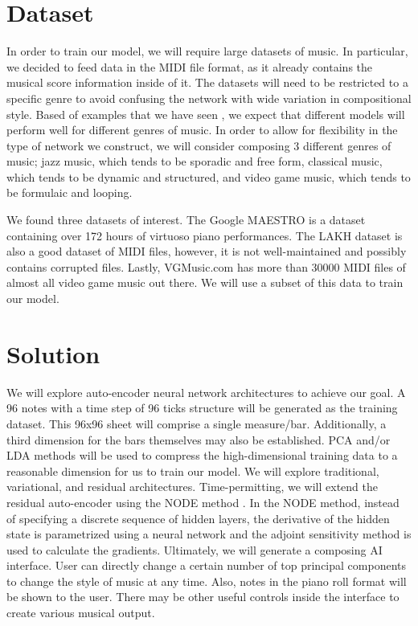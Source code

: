 \documentclass[conference]{IEEEtran}
\begin{document}
\section{Dataset}
In order to train our model, we will require large datasets of music. In particular, we decided to feed data in the MIDI file format, as it already contains the musical score information inside of it. The datasets will need to be restricted to a specific genre to avoid confusing the network with wide variation in compositional style. Based of examples that we have seen \cite{ComposerVideo}\cite{JazzVideo}\cite{BaroqueVideo}, we expect that different models will perform well for different genres of music. In order to allow for flexibility in the type of network we construct, we will consider composing 3 different genres of music; jazz music, which tends to be sporadic and free form, classical music, which tends to be dynamic and structured, and video game music, which tends to be formulaic and looping.\par 
We found three datasets of interest. The Google MAESTRO \cite{maestro2018} is a dataset containing over 172 hours of virtuoso piano performances. The LAKH dataset \cite{lakh2011} is also a good dataset of MIDI files, however, it is not well-maintained and possibly contains corrupted files. Lastly, VGMusic.com \cite{vgmusic} has more than 30000 MIDI files of almost all video game music out there. We will use a subset of this data to train our model.


\section{Solution}
We will explore auto-encoder neural network architectures to achieve our goal.
A 96 notes with a time step of 96 ticks structure will be generated as the training dataset. This 96x96 sheet will comprise a single measure/bar. Additionally, a third dimension for the bars themselves may also be established. PCA and/or LDA methods will be used to compress the high-dimensional training data to a reasonable dimension for us to train our model. We will explore traditional, variational, and residual architectures. Time-permitting, we will extend the residual auto-encoder using the NODE method \cite{NODE}. In the NODE method, instead of specifying a discrete sequence of hidden layers,  the derivative of the hidden state is parametrized using a neural network and the adjoint sensitivity method is used to calculate the gradients. Ultimately, we will generate a composing AI interface. User can directly change a certain number of top principal components to change the style of music at any time. Also, notes in the piano roll format will be shown to the user. There may be other useful controls inside the interface to create various musical output.
\end{document}
